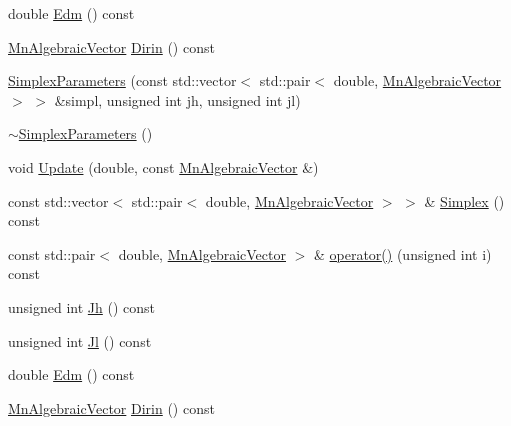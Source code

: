 \begin{DoxyCompactItemize}
\item 
double \mbox{\hyperlink{classROOT_1_1Minuit2_1_1SimplexParameters_ad71f372dd3873cbf351dc8eddc3a9c9a}{Edm}} () const
\item 
\mbox{\hyperlink{namespaceROOT_1_1Minuit2_a62ed97730a1ca8d3fbaec64a19aa11c9}{Mn\+Algebraic\+Vector}} \mbox{\hyperlink{classROOT_1_1Minuit2_1_1SimplexParameters_a40e7b3b27280a376a063a1c81904cc75}{Dirin}} () const
\item 
\mbox{\hyperlink{classROOT_1_1Minuit2_1_1SimplexParameters_a65e9ef329f7c1be19f68e0a1b817c584}{Simplex\+Parameters}} (const std\+::vector$<$ std\+::pair$<$ double, \mbox{\hyperlink{namespaceROOT_1_1Minuit2_a62ed97730a1ca8d3fbaec64a19aa11c9}{Mn\+Algebraic\+Vector}} $>$ $>$ \&simpl, unsigned int jh, unsigned int jl)
\item 
\mbox{\hyperlink{classROOT_1_1Minuit2_1_1SimplexParameters_a13162b4c95b96890972dc24e7ba2e9a8}{$\sim$\+Simplex\+Parameters}} ()
\item 
void \mbox{\hyperlink{classROOT_1_1Minuit2_1_1SimplexParameters_aa9536cc9c7754ce308160d5e456ac54f}{Update}} (double, const \mbox{\hyperlink{namespaceROOT_1_1Minuit2_a62ed97730a1ca8d3fbaec64a19aa11c9}{Mn\+Algebraic\+Vector}} \&)
\item 
const std\+::vector$<$ std\+::pair$<$ double, \mbox{\hyperlink{namespaceROOT_1_1Minuit2_a62ed97730a1ca8d3fbaec64a19aa11c9}{Mn\+Algebraic\+Vector}} $>$ $>$ \& \mbox{\hyperlink{classROOT_1_1Minuit2_1_1SimplexParameters_a873b8883c6932b879348e73d36d86afb}{Simplex}} () const
\item 
const std\+::pair$<$ double, \mbox{\hyperlink{namespaceROOT_1_1Minuit2_a62ed97730a1ca8d3fbaec64a19aa11c9}{Mn\+Algebraic\+Vector}} $>$ \& \mbox{\hyperlink{classROOT_1_1Minuit2_1_1SimplexParameters_aa05f3fb5da27277879fad702d85bae49}{operator()}} (unsigned int i) const
\item 
unsigned int \mbox{\hyperlink{classROOT_1_1Minuit2_1_1SimplexParameters_a54250c0d286fcf4d6bbb45df037c7d85}{Jh}} () const
\item 
unsigned int \mbox{\hyperlink{classROOT_1_1Minuit2_1_1SimplexParameters_accfb7ec2b1087661ed3c31dfbb473413}{Jl}} () const
\item 
double \mbox{\hyperlink{classROOT_1_1Minuit2_1_1SimplexParameters_ad71f372dd3873cbf351dc8eddc3a9c9a}{Edm}} () const
\item 
\mbox{\hyperlink{namespaceROOT_1_1Minuit2_a62ed97730a1ca8d3fbaec64a19aa11c9}{Mn\+Algebraic\+Vector}} \mbox{\hyperlink{classROOT_1_1Minuit2_1_1SimplexParameters_a40e7b3b27280a376a063a1c81904cc75}{Dirin}} () const
\end{DoxyCompactItemize}


